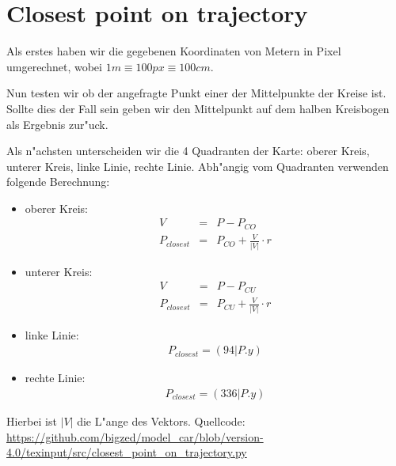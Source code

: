 \documentclass[10pt,oneside,a4paper]{article}
\begin{document}
  \section{Closest point on trajectory}
    Als erstes haben wir die gegebenen Koordinaten von Metern in Pixel umgerechnet, wobei \( 1m
    \equiv 100px \equiv 100cm \).

    Nun testen wir ob der angefragte Punkt einer der Mittelpunkte der Kreise ist. Sollte dies der
    Fall sein geben wir den Mittelpunkt auf dem halben Kreisbogen als Ergebnis zur"uck.

    Als n"achsten unterscheiden wir die 4 Quadranten der Karte: oberer Kreis, unterer Kreis, linke
    Linie, rechte Linie. Abh"angig vom Quadranten verwenden folgende Berechnung:
    \begin{itemize}
      \item{oberer Kreis:}
        \begin{eqnarray*}
          V & = & P - P_{CO} \\
          P_{closest} & = & P_{CO} + \frac{V}{|V|} \cdot r
        \end{eqnarray*}
      \item{unterer Kreis:}
        \begin{eqnarray*}
          V & = & P - P_{CU}\\
          P_{closest} & = & P_{CU} + \frac{V}{|V|} \cdot r
        \end{eqnarray*}
      \item{linke Linie:}
        \begin{eqnarray*}
          P_{closest} = (94 | P.y)
        \end{eqnarray*}
      \item{rechte Linie:}
        \begin{eqnarray*}
          P_{closest} = (336 | P.y)
        \end{eqnarray*}
    \end{itemize}
    Hierbei ist \( |V| \) die L"ange des Vektors. Quellcode:
    \url{https://github.com/bigzed/model_car/blob/version-4.0/texinput/src/closest_point_on_trajectory.py}
\end{document}
